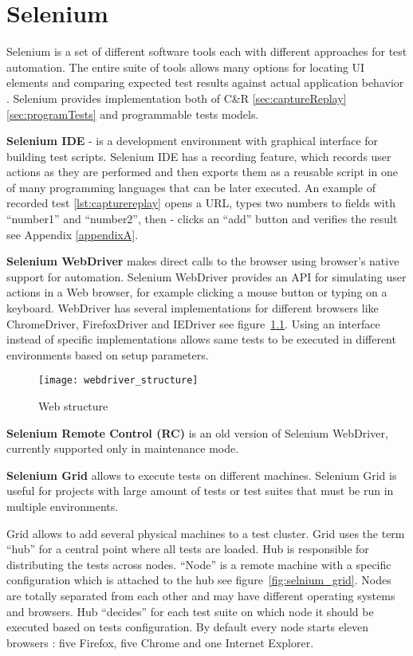 	\chapter {Selenium}
	\label{ch:selenium}
      Selenium is a set of different software tools each with different
      approaches for test automation. The entire suite of tools
      allows many options for locating UI elements and comparing expected test results
       against actual application behavior \cite{seleniumSite}.
       Selenium provides implementation both of C\&R \ref{sec:captureReplay}
       \ref{sec:programTests} and programmable tests models.  
       
       \textbf{Selenium IDE} - is a development environment with graphical
       interface for building test scripts.
		Selenium IDE has a recording feature,  which records user actions as they are
		performed and then exports them as a reusable script in one of many programming languages that can be later executed.
		An example of recorded test \ref{lst:capturereplay} opens a URL, types two
		numbers to fields with ``number1'' and ``number2'', then -
		clicks an ``add'' button and verifies the result see Appendix \ref{appendixA}.
		
\textbf{Selenium  WebDriver} makes direct calls to the browser using
browser's native support for automation. Selenium WebDriver provides an
API for simulating user actions in a Web browser, for example
clicking a mouse button or typing on a keyboard. WebDriver has several
implementations for different browsers like ChromeDriver, FirefoxDriver
and IEDriver see figure~\ref{fig:webdriver}.
Using an interface instead of specific implementations  allows same tests to be
executed in different environments based on setup parameters.
       
	  \begin{figure}
	  \centering
  		\texttt{[image: webdriver\_structure]}
  		\caption{Web structure}
  		\label{fig:webdriver}
		\end{figure}
		
    	\textbf{Selenium Remote Control (RC)} is an old version of Selenium
    	WebDriver, currently supported only in maintenance mode.
       
       \textbf{Selenium Grid} allows to execute tests on different machines.
       Selenium Grid is useful for projects with large amount of tests or test
       suites that must be run in multiple environments.
       
Grid allows to add several physical machines to a test cluster. Grid uses the
term ``hub'' for a central point where all tests are loaded. Hub is responsible
for distributing the tests across nodes. ``Node'' is  a remote machine with
a specific configuration which is attached to the hub see
figure~\ref{fig:selnium_grid}. Nodes are totally separated from each other and
may have different operating systems and browsers. Hub ``decides''
for each test suite on which node it should be executed based on tests configuration.
By default every node starts eleven browsers : five Firefox, five Chrome and
one Internet Explorer.
		
